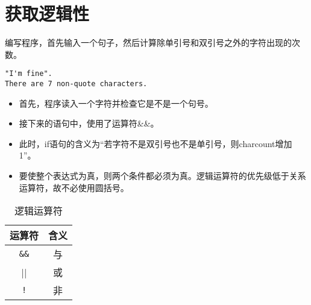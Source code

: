 \section{获取逻辑性}

\begin{frame}[fragile]\ft{\secname}
\begin{li}
编写程序，首先输入一个句子，然后计算除单引号和双引号之外的字符出现的次数。
\end{li}
\end{frame}

\begin{frame}[fragile]\ft{\secname}

\end{frame}

\begin{frame}[fragile]\ft{\secname}
\begin{lstlisting}
"I'm fine".
There are 7 non-quote characters.
\end{lstlisting}

\end{frame}

\begin{frame}[fragile]\ft{\secname}
\begin{itemize}
\item  首先，程序读入一个字符并检查它是不是一个句号。\\[0.1in]
\item 接下来的语句中，使用了运算符\&\&。
\item[] 此时，if语句的含义为“若字符不是双引号也不是单引号，则charcount增加1”。\\[0.1in]
\item 要使整个表达式为真，则两个条件都必须为真。逻辑运算符的优先级低于关系运算符，故不必使用圆括号。
\end{itemize}
\end{frame}

\begin{frame}[fragile]\ft{\secname}
\begin{table}
\centering
\caption{逻辑运算符}
\begin{tabular}{c|c}\hline\hline
运算符&含义 \\\hline
\lstinline|&&| & 与  \\[0.1in]
\lstinline|||| & 或  \\[0.1in]
\lstinline|!| & 非  \\\hline\hline
\end{tabular}
\end{table}
\end{frame}

